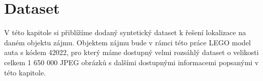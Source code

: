 \chapter{Dataset}
\label{sec:Chapter3}
V této kapitole si přiblížíme dodaný syntetický dataset k řešení lokalizace na daném objektu zájmu. Objektem zájmu bude v rámci této práce LEGO model auta s kódem 42022, pro který máme dostupný velmi rozsáhlý dataset o velikosti celkem 1 650 000 JPEG obrázků s dalšími dostupnými informacemi popsanými v této kapitole.
\endinput
